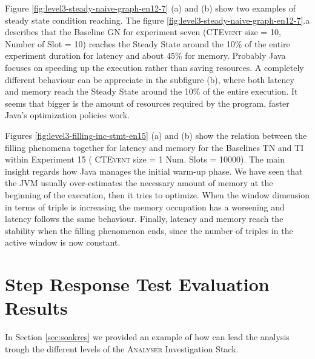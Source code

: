 Figure \ref{fig:level3-steady-naive-graph-en12-7} (a) and (b) show two examples of steady state condition reaching. The figure \ref{fig:level3-steady-naive-graph-en12-7}.a describes that the Baseline GN for experiment seven (\textsc{CTEvent} size = 10, Number of Slot = 10) reaches the Steady State around the 10\% of the entire experiment duration for latency and about 45\% for memory. 
Probably Java focuses on speeding up the execution rather than saving resources. A completely different behaviour can be appreciate in the subfigure (b), where both latency and memory reach the Steady State around the 10\% of the entire execution. It seems that bigger is the amount of resources required by the program, faster Java's optimization policies work.

Figures \ref{fig:level3-filling-inc-stmt-en15} (a) and (b) show the relation between the filling phenomena together for latency and memory for the Baselines TN and TI within Experiment 15 ( \textsc{CTEvent} size = 1 Num. Slots = 10000). The main insight regards how Java manages the initial warm-up phase. We have seen that the JVM usually over-estimates the necessary amount of memory at the beginning of the execution, then it tries to optimize. When the window dimension in terms of triple is increasing the memory occupation has a worsening and latency follows the same behaviour. Finally, latency and memory reach the stability when the filling phenomenon ends, since the number of triples in the active window is now constant.















\pagebreak

\section{Step Response Test Evaluation Results}\label{sec:stressres}

In Section \ref{sec:soakres} we provided an example of how \name can lead the analysis trough the different levels of the \textsc{Analyser} Investigation Stack. 

